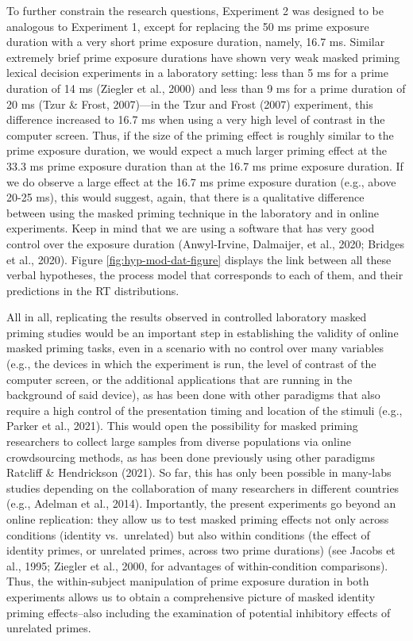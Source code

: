 \documentclass[
  english,
  man,floatsintext]{apa6}
\begin{document}
To further constrain the research questions, Experiment 2 was designed to be analogous to Experiment 1, except for replacing the 50 ms prime exposure duration with a very short prime exposure duration, namely, 16.7 ms. Similar extremely brief prime exposure durations have shown very weak masked priming lexical decision experiments in a laboratory setting: less than 5 ms for a prime duration of 14 ms (Ziegler et al., 2000) and less than 9 ms for a prime duration of 20 ms (Tzur \& Frost, 2007)---in the Tzur and Frost (2007) experiment, this difference increased to 16.7 ms when using a very high level of contrast in the computer screen. Thus, if the size of the priming effect is roughly similar to the prime exposure duration, we would expect a much larger priming effect at the 33.3 ms prime exposure duration than at the 16.7 ms prime exposure duration. If we do observe a large effect at the 16.7 ms prime exposure duration (e.g., above 20-25 ms), this would suggest, again, that there is a qualitative difference between using the masked priming technique in the laboratory and in online experiments. Keep in mind that we are using a software that has very good control over the exposure duration (Anwyl-Irvine, Dalmaijer, et al., 2020; Bridges et al., 2020). Figure \ref{fig:hyp-mod-dat-figure} displays the link between all these verbal hypotheses, the process model that corresponds to each of them, and their predictions in the RT distributions.

All in all, replicating the results observed in controlled laboratory masked priming studies would be an important step in establishing the validity of online masked priming tasks, even in a scenario with no control over many variables (e.g., the devices in which the experiment is run, the level of contrast of the computer screen, or the additional applications that are running in the background of said device), as has been done with other paradigms that also require a high control of the presentation timing and location of the stimuli (e.g., Parker et al., 2021). This would open the possibility for masked priming researchers to collect large samples from diverse populations via online crowdsourcing methods, as has been done previously using other paradigms Ratcliff \& Hendrickson (2021). So far, this has only been possible in many-labs studies depending on the collaboration of many researchers in different countries (e.g., Adelman et al., 2014). Importantly, the present experiments go beyond an online replication: they allow us to test masked priming effects not only across conditions (identity vs.~unrelated) but also within conditions (the effect of identity primes, or unrelated primes, across two prime durations) (see Jacobs et al., 1995; Ziegler et al., 2000, for advantages of within-condition comparisons). Thus, the within-subject manipulation of prime exposure duration in both experiments allows us to obtain a comprehensive picture of masked identity priming effects--also including the examination of potential inhibitory effects of unrelated primes.
\end{document}
